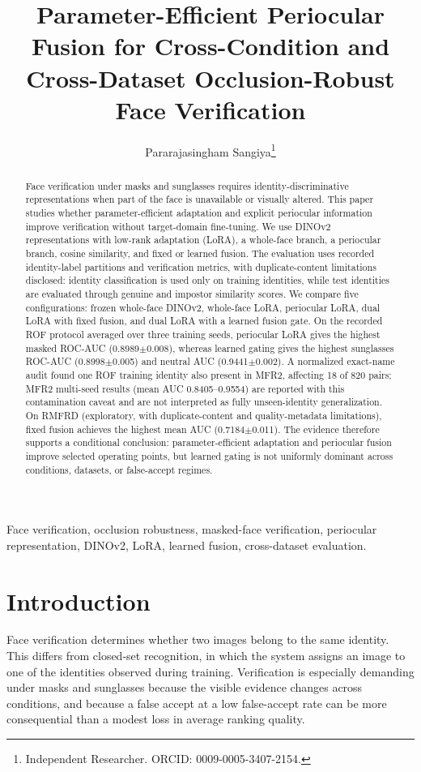 \documentclass[10pt,journal,compsoc]{IEEEtran}
\title{Parameter-Efficient Periocular Fusion for Cross-Condition and Cross-Dataset Occlusion-Robust Face Verification}
\author{Pararajasingham Sangiya\thanks{Independent Researcher. ORCID: 0009-0005-3407-2154.}}
\begin{document}
\maketitle
\begin{abstract}
Face verification under masks and sunglasses requires identity-discriminative representations when part of the face is unavailable or visually altered. This paper studies whether parameter-efficient adaptation and explicit periocular information improve verification without target-domain fine-tuning. We use DINOv2 representations with low-rank adaptation (LoRA), a whole-face branch, a periocular branch, cosine similarity, and fixed or learned fusion. The evaluation uses recorded identity-label partitions and verification metrics, with duplicate-content limitations disclosed: identity classification is used only on training identities, while test identities are evaluated through genuine and impostor similarity scores. We compare five configurations: frozen whole-face DINOv2, whole-face LoRA, periocular LoRA, dual LoRA with fixed fusion, and dual LoRA with a learned fusion gate. On the recorded ROF protocol averaged over three training seeds, periocular LoRA gives the highest masked ROC-AUC (0.8989$\pm$0.008), whereas learned gating gives the highest sunglasses ROC-AUC (0.8998$\pm$0.005) and neutral AUC (0.9441$\pm$0.002). A normalized exact-name audit found one ROF training identity also present in MFR2, affecting 18 of 820 pairs; MFR2 multi-seed results (mean AUC 0.8405--0.9554) are reported with this contamination caveat and are not interpreted as fully unseen-identity generalization. On RMFRD (exploratory, with duplicate-content and quality-metadata limitations), fixed fusion achieves the highest mean AUC (0.7184$\pm$0.011). The evidence therefore supports a conditional conclusion: parameter-efficient adaptation and periocular fusion improve selected operating points, but learned gating is not uniformly dominant across conditions, datasets, or false-accept regimes.
\end{abstract}
\begin{IEEEkeywords}
Face verification, occlusion robustness, masked-face verification, periocular representation, DINOv2, LoRA, learned fusion, cross-dataset evaluation.
\end{IEEEkeywords}

\section{Introduction}
Face verification determines whether two images belong to the same identity. This differs from closed-set recognition, in which the system assigns an image to one of the identities observed during training. Verification is especially demanding under masks and sunglasses because the visible evidence changes across conditions, and because a false accept at a low false-accept rate can be more consequential than a modest loss in average ranking quality.
\end{document}
